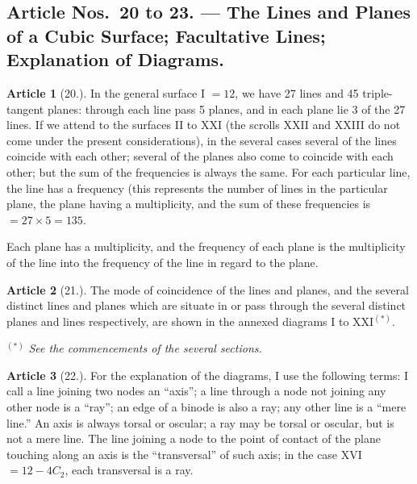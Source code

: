 \documentclass[11pt,a4paper]{article}
\theoremstyle{definition}
\newtheorem{art}{Article}
\begin{document}
\newpage
\setcounter{page}{366}

\subsection*{Article Nos.~20 to 23. --- The Lines and Planes of a Cubic Surface; Facultative Lines; Explanation of Diagrams.}

\begin{art}[20.]
In the general surface I $= 12$, we have 27 lines and 45 triple-tangent planes: through each line pass 5 planes, and in each plane lie 3 of the 27 lines. If we attend to the surfaces II to XXI (the scrolls XXII and XXIII do not come under the present considerations), in the several cases several of the lines coincide with each other; several of the planes also come to coincide with each other; but the sum of the frequencies is always the same. For each particular line, the line has a frequency (this represents the number of lines in the particular plane, the plane having a multiplicity, and the sum of these frequencies is $= 27 \times 5 = 135$.

Each plane has a multiplicity, and the frequency of each plane is the multiplicity of the line into the frequency of the line in regard to the plane.
\end{art}

\begin{art}[21.]
The mode of coincidence of the lines and planes, and the several distinct lines and planes which are situate in or pass through the several distinct planes and lines respectively, are shown in the annexed diagrams I to XXI$^{(*)}$.

\small$^{(*)}$ \textit{See the commencements of the several sections.}
\end{art}

\begin{art}[22.]
For the explanation of the diagrams, I use the following terms: I call a line joining two nodes an ``axis''; a line through a node not joining any other node is a ``ray''; an edge of a binode is also a ray; any other line is a ``mere line.'' An axis is always torsal or oscular; a ray may be torsal or oscular, but is not a mere line. The line joining a node to the point of contact of the plane touching along an axis is the ``transversal'' of such axis; in the case XVI $= 12 - 4C_2$, each transversal is a ray.
\end{art}
\end{document}
